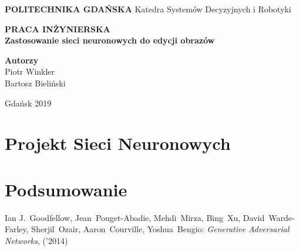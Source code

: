\documentclass[10pt]{article}
\begin{document}
\baselineskip=12pt  %
\linespread{1.25} %



\begin{titlepage}
  \begin{center}

    \vspace*{1cm}
    \Huge
    \textbf{POLITECHNIKA GDAŃSKA}
    \newline
    \vspace{0.5cm}
    \LARGE
    Katedra Systemów Decyzyjnych i Robotyki

    \vspace{1.5cm}
    \textbf{PRACA INŻYNIERSKA}
    \\[0.5cm]
    \textbf{Zastosowanie sieci neuronowych do edycji obrazów}

    \vspace{2.5cm}
    \Large
    \textbf{Autorzy}\\
    Piotr Winkler\\
    Bartosz Bieliński

    \vspace{3.5cm}
    Gdańsk 2019

  \end{center}
\end{titlepage}

\setcounter{page}{2}






\newpage
  \tableofcontents





\section{Projekt Sieci Neuronowych}

\section{Podsumowanie}


\newpage
\begin{thebibliography}{99} %
   Ian J.~Goodfellow, Jean~Pouget-Abadie, Mehdi~Mirza, Bing~Xu, David~Warde-Farley, Sherjil~Ozair, Aaron~Courville, Yoshua~Bengio:
  \emph{Generative Adversarial Networks}, ('2014)
\end{thebibliography}


\end{document}
